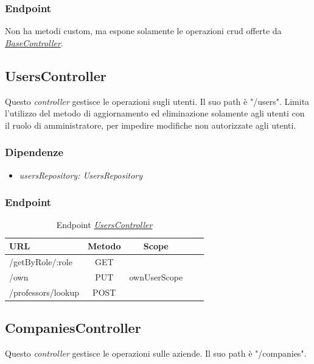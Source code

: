 \subsubsection{Endpoint}

Non ha metodi custom, ma espone solamente le operazioni \acrshort{crud} offerte da \hyperref[server:base-controller]{\textit{BaseController}}.

\subsection{UsersController}

Questo \textit{controller} gestisce le operazioni sugli utenti. Il suo path è "/users". Limita l'utilizzo del metodo di aggiornamento ed eliminazione solamente agli utenti con il ruolo di amministratore, per impedire modifiche non autorizzate agli utenti.
\subsubsection{Dipendenze}
\begin{itemize}[itemsep=0pt]
	\item \textit{usersRepository: UsersRepository}
\end{itemize}

\subsubsection{Endpoint}
\label{server:users-controller}
\begin{table}[H]
	\ttfamily
	\caption{Endpoint \hyperref[server:users-controller]{\textit{UsersController}}}
	\centering
	\label{table:api:users-controller}
	\begin{tabular}{l c c c c}    
		URL  & Metodo & Scope \\ 
		\midrule
		/getByRole/:role & GET    \\
		/own & PUT & ownUserScope   \\
		/professors/lookup & POST   \\
		\bottomrule
	\end{tabular}
\end{table}

\pagebreak
\subsection{CompaniesController}

Questo \textit{controller} gestisce le operazioni sulle aziende. Il suo path è "/companies".

